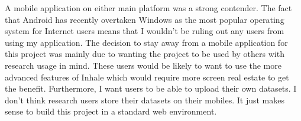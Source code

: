 A mobile application on either main platform was a strong contender. The fact that Android has recently overtaken Windows as the most popular operating system for Internet users \cite{android} means that I wouldn't be ruling out any users from using my application. The decision to stay away from a mobile application for this project was mainly due to wanting the project to be used by others with research usage in mind. These users would be likely to want to use the more advanced features of Inhale which would require more screen real estate to get the benefit. Furthermore, I want users to be able to upload their own datasets. I don't think research users store their datasets on their mobiles. It just makes sense to build this project in a standard web environment.\\
